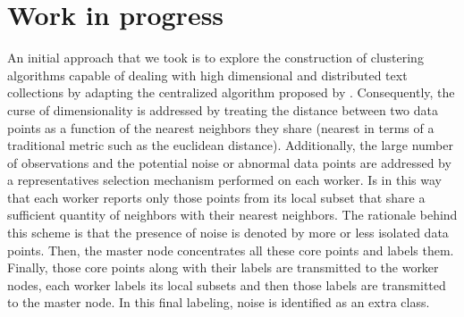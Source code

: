 \documentclass[10pt]{article}
\begin{document}
\section{Work in progress}


An initial approach that we took is to explore the construction of clustering algorithms capable of dealing with high dimensional and distributed text collections by adapting the centralized algorithm proposed by \cite{ESK03}.
Consequently, the curse of dimensionality is addressed by treating the distance between two data points as a function of the nearest neighbors they share (nearest in terms of a traditional metric such as the euclidean distance).
Additionally, the large number of observations and the potential noise or abnormal data points are addressed by a representatives selection mechanism performed on each worker.
Is in this way that each worker reports only those points from its local subset that share a sufficient quantity of neighbors with their nearest neighbors. 
The rationale behind this scheme is that the presence of noise is denoted by more or less isolated data points.
Then, the master node concentrates all these core points and labels them. Finally, those core points along with their labels are transmitted to the worker nodes, each worker labels its local subsets and then those labels are transmitted to the master node. In this final labeling, noise is identified as an extra class.
\end{document}
